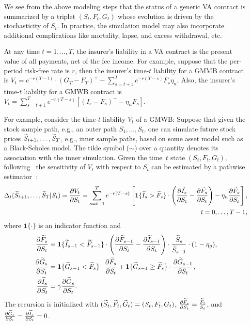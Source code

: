 We see from the above modeling steps that the status of a generic VA contract is summarized by a triplet $(S_t,F_t,G_t)$ whose evolution is driven by the stochasticity of $S_t$.
In practice, the simulation model may also incorporate additional complications like mortality, lapse, and excess withdrawal, etc.

At any time $t=1,\ldots,T$, the insurer's liability in a VA contract is the present value of all payments, net of the fee income.
For example, suppose that the per-period risk-free rate is $r$, then
the insurer's time-$t$ liability for a GMMB contract is $V_t = e^{-r(T-t)}\cdot (G_T - F_T)^+ - \sum_{s=t+1}^{T} e^{-r(T-s)} F_s \eta_n$.
Also, the insurer's time-$t$ liability for a GMWB contract is $V_t = \sum_{s=t+1}^{T} e^{-r(T-s)} [(I_s - F_s)^+- \eta_n F_s] $.

For example, consider the time-$t$ liability $V_t$ of a GMWB:
Suppose that given the stock sample path, e.g., an outer path $S_1,\ldots,S_t$, one can simulate future stock prices $\widetilde{S}_{t+1},\ldots,\widetilde{S}_{T}$, e.g., inner sample paths, based on some asset model such as a Black-Scholes model.
The tilde symbol ($\sim$) over a quantity denotes its association with the inner simulation.
Given the time~$t$ state $(S_t,F_t,G_t)$, following~\cite{cathcart2015calculating} the sensitivity of $V_t$ with respect to $S_t$ can be estimated by a pathwise estimator~\citep{glasserman2004monte}:
\begin{align}\label{eq2:delta}
    \Delta_t(\widetilde{S}_{t+1},\ldots,\widetilde{S}_{T} | S_t) = \frac{\partial V_t}{\partial S_t} = \sum_{s=t+1}^{T} e^{-r(T-s)} \left[\bm{1}\{\widetilde{I}_s > \widetilde{F}_s\} \cdot \left( \frac{\partial \widetilde{I}_s}{ \partial S_t} - \frac{\partial \widetilde{F}_s}{ \partial S_t}\right)- \eta_n \frac{\partial \widetilde{F}_s}{ \partial S_t}\right], \nonumber \\
    t=0,\ldots,T-1,
\end{align}
where $\bm{1}\{\cdot\}$ is an indicator function and
\begin{align*}
    \frac{\partial \widetilde{F}_s}{ \partial S_t} &= \bm{1}\{\widetilde{I}_{s-1} < \widetilde{F}_{s-1}\}\cdot\left( \frac{\partial \widetilde{F}_{s-1}}{ \partial S_t} - \frac{\partial \widetilde{I}_{s-1}}{ \partial S_t}\right) \cdot \frac{\widetilde{S}_s}{\widetilde{S}_{s-1}}\cdot (1-\eta_g),\\
    \frac{\partial \widetilde{G}_s}{ \partial S_t} &= \bm{1}\{\widetilde{G}_{s-1} < \widetilde{F}_{s}\}\cdot\frac{\partial \widetilde{F}_{s}}{ \partial S_t} + \bm{1}\{\widetilde{G}_{s-1} \geq \widetilde{F}_{s}\}\cdot\frac{\partial \widetilde{G}_{s-1}}{ \partial S_t},\\
    \frac{\partial \widetilde{I}_s}{ \partial S_t} &= \gamma \frac{\partial \widetilde{G}_s}{ \partial S_t}.
\end{align*}
The recursion is initialized with $(\widetilde{S}_t,\widetilde{F}_t,\widetilde{G}_t) = (S_t,F_t,G_t)$, $\frac{\partial \widetilde{F}_s}{ \partial S_t} = \frac{\widetilde{F}_t}{S_t}$, and $\frac{\partial \widetilde{G}_s}{ \partial S_t} = \frac{\partial \widetilde{I}_s}{ \partial S_t} = 0$.


